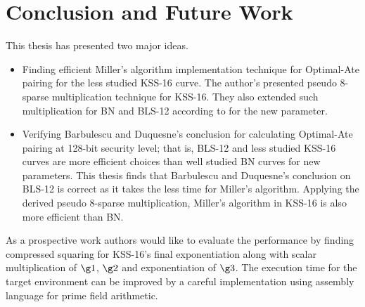 \section{Conclusion and Future Work}
This thesis has presented two major ideas.
\begin{itemize}
\item Finding efficient Miller's algorithm implementation technique for Optimal-Ate pairing for the less studied KSS-16 curve. The author's presented pseudo 8-sparse multiplication technique for KSS-16. They also extended such multiplication for BN and BLS-12 according to \cite{PAIRING:MANS13} for the new parameter. 
\item Verifying Barbulescu and Duquesne's conclusion \cite{sylvain_new_param} for calculating Optimal-Ate pairing at 128-bit security level; that is, BLS-12 and less studied KSS-16 curves are more efficient choices than well studied BN curves for new parameters. 
This thesis finds that Barbulescu and Duquesne's conclusion on BLS-12 is correct as it takes the less time for Miller's algorithm.
Applying the derived pseudo 8-sparse multiplication, Miller's algorithm in KSS-16 is also more efficient than BN.
\end{itemize}
As a prospective work authors would like to evaluate the performance by finding compressed squaring for KSS-16's final exponentiation along with scalar multiplication of $\g1$, $\g2$ and exponentiation of $\g3$. The execution time for the target environment can be improved by a careful implementation using assembly language for prime field arithmetic.  
